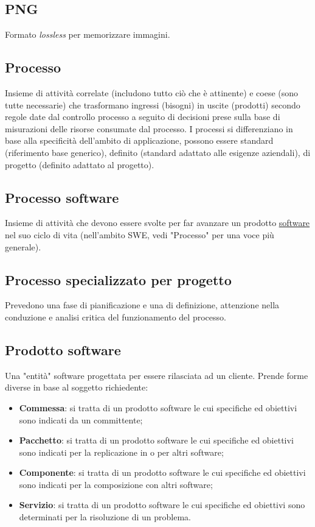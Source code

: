 	\subsection{PNG}
	\label{sec:png}
	Formato \emph{lossless} per memorizzare immagini.


	\subsection{Processo}
	\label{sec:processi}
	Insieme di attività correlate (includono tutto ciò che è attinente) e coese (sono tutte necessarie) che trasformano ingressi (bisogni) in uscite (prodotti) secondo regole date dal controllo processo a seguito di decisioni prese sulla base di misurazioni delle risorse consumate dal processo.
	I processi si differenziano in base alla specificità dell'ambito di applicazione, possono essere standard (riferimento base generico), definito (standard adattato alle esigenze aziendali), di progetto (definito adattato al progetto).


	\subsection{Processo software}
	\label{sec:processisoftware}
	Insieme di attività che devono essere svolte per far avanzare un prodotto \underline{\hyperref[sec:prodottosoftware]{software}} nel suo ciclo di vita (nell'ambito SWE, vedi "Processo" per una voce più generale).


	\subsection{Processo specializzato per progetto}
	\label{sec:processispecializzati}
	Prevedono una fase di pianificazione e una di definizione, attenzione nella conduzione e analisi critica del funzionamento del processo.


	\subsection{Prodotto software}
	\label{sec:prodottosoftware}
	Una "entità" software progettata per essere rilasciata ad un cliente.
	Prende forme diverse in base al soggetto richiedente:
	\begin{itemize}
		\item\textbf{Commessa}: si tratta di un prodotto software le cui specifiche ed obiettivi sono indicati da un committente;
		\item\textbf{Pacchetto}: si tratta di un prodotto software le cui specifiche ed obiettivi sono indicati per la replicazione in o per altri software;
		\item\textbf{Componente}: si tratta di un prodotto software le cui specifiche ed obiettivi sono indicati per la composizione con altri software;
		\item\textbf {Servizio}: si tratta di un prodotto software le cui specifiche ed obiettivi sono determinati per la risoluzione di un problema.
	\end{itemize}


